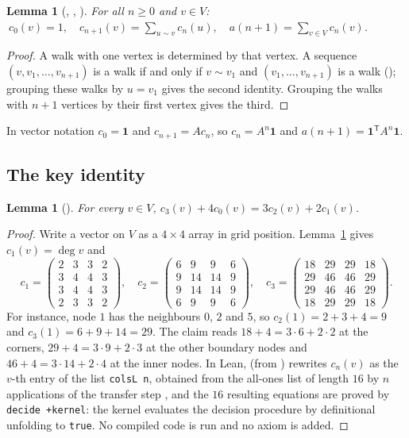 \documentclass[11pt]{amsart}
\theoremstyle{plain}
\newtheorem{lemma}[theorem]{Lemma}
\theoremstyle{definition}
\newcommand{\one}{\mathbf{1}}
\begin{document}
\begin{lemma}[, , ]\label{lem:transfer}
For all $n\ge0$ and $v\in V$: $\ c_0(v)=1,\quad c_{n+1}(v)=\sum_{u\sim v}c_n(u),\quad a(n+1)=\sum_{v\in V}c_n(v)$.
\end{lemma}

\begin{proof}
A walk with one vertex is determined by that vertex. A sequence $(v,v_1,\dots,v_{n+1})$ is a walk if and only if $v\sim v_1$ and $(v_1,\dots,v_{n+1})$ is a walk (); grouping these walks by $u=v_1$ gives the second identity. Grouping the walks with $n+1$ vertices by their first vertex gives the third.
\end{proof}

In vector notation $c_0=\one$ and $c_{n+1}=Ac_n$, so $c_n=A^n\one$ and $a(n+1)=\one^{\mathsf T}A^n\one$.

\subsection{The key identity}

\begin{lemma}[]\label{lem:base}
For every $v\in V$, $c_3(v)+4c_0(v)=3c_2(v)+2c_1(v)$.
\end{lemma}

\begin{proof}
Write a vector on $V$ as a $4\times4$ array in grid position. Lemma~\ref{lem:transfer} gives $c_1(v)=\deg v$ and
\[
  c_1=\begin{pmatrix}2&3&3&2\\3&4&4&3\\3&4&4&3\\2&3&3&2\end{pmatrix},\quad
  c_2=\begin{pmatrix}6&9&9&6\\9&14&14&9\\9&14&14&9\\6&9&9&6\end{pmatrix},\quad
  c_3=\begin{pmatrix}18&29&29&18\\29&46&46&29\\29&46&46&29\\18&29&29&18\end{pmatrix}.
\]
For instance, node $1$ has the neighbours $0$, $2$ and $5$, so $c_2(1)=2+3+4=9$ and $c_3(1)=6+9+14=29$. The claim reads $18+4=3\cdot6+2\cdot2$ at the corners, $29+4=3\cdot9+2\cdot3$ at the other boundary nodes and $46+4=3\cdot14+2\cdot4$ at the inner nodes.
In Lean,  (from ) rewrites $c_n(v)$ as the $v$-th entry of the list \texttt{colsL n}, obtained from the all-ones list of length $16$ by $n$ applications of the transfer step , and the $16$ resulting equations are proved by \texttt{decide +kernel}: the kernel evaluates the decision procedure by definitional unfolding to \texttt{true}. No compiled code is run and no axiom is added.
\end{proof}
\end{document}
